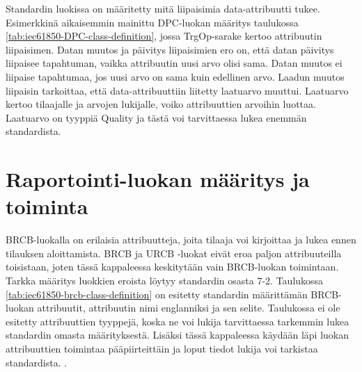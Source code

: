 Standardin luokissa on määritetty mitä liipaisimia data-attribuutti tukee. Esimerkkinä aikaisemmin mainittu DPC-luo\-kan määritys taulukossa \ref{tab:iec61850-DPC-class-definition}, jossa TrgOp-sarake kertoo attribuutin liipaisimen. Datan muutos ja päivitys liipaisimien ero on, että datan päivitys liipaisee tapahtuman, vaikka attribuutin uusi arvo olisi sama. Datan muutos ei liipaise tapahtumaa, jos uusi arvo on sama kuin edellinen arvo. Laadun muutos liipaisin tarkoittaa, että data-attribuuttiin liitetty laatuarvo muuttui. Laatuarvo kertoo tilaajalle ja arvojen lukijalle, voiko attribuuttien arvoihin luottaa. Laatuarvo on tyyppiä Quality ja tästä voi tarvittaessa lukea enemmän standardista. \mbox{\cite[s.~90]{IEC61850-7-1}}


\section{Raportointi-luokan määritys ja toiminta}
\label{ch:rcb-toiminta}


BRCB-luokalla on erilaisia attribuutteja, joita tilaaja voi kirjoittaa ja lukea ennen tilauksen aloittamista. BRCB ja URCB -luokat eivät eroa paljon attribuuteilla toisistaan, joten tässä kappaleessa keskitytään vain BRCB-luokan toimintaan. Tarkka määritys luokkien eroista löytyy standardin osasta 7-2. Taulukossa \ref{tab:iec61850-brcb-class-definition} on esitetty standardin määrittämän BRCB-luokan attribuutit, attribuutin nimi englanniksi ja sen selite. Taulukossa ei ole esitetty attribuuttien tyyppejä, koska ne voi lukija tarvittaessa tarkemmin lukea standardin omasta määrityksestä. Lisäksi tässä kappaleessa käydään läpi luokan attribuuttien toimintaa pääpiirteittäin ja loput tiedot lukija voi tarkistaa standardista. \mbox{\cite[s.~93--118]{IEC61850-7-2}}.

